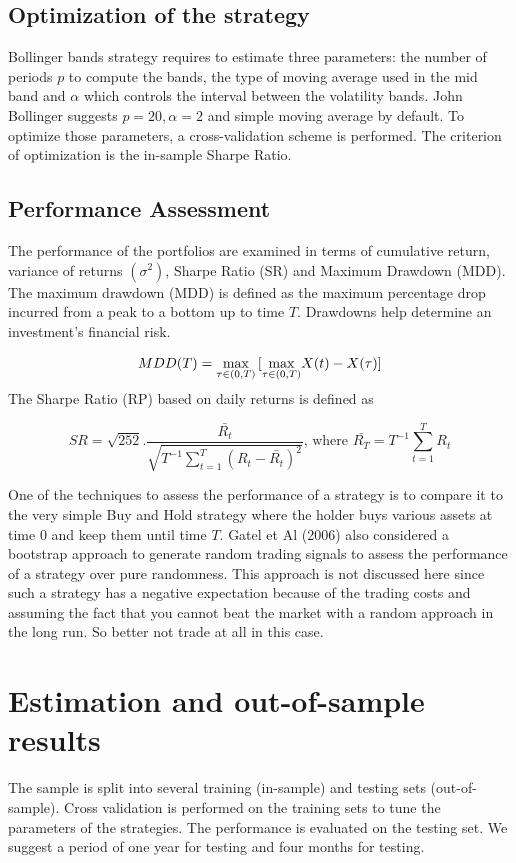 \documentclass[11pt,a4,twosided,singlespacing,titlepagenumber=on]{scrreprt}
\numberwithin{equation}{chapter} %
\theoremstyle{remark}
\begin{document}
\subsection{Optimization of the strategy}

Bollinger bands strategy requires to estimate three parameters: the number of periods $p$ to compute the bands, the type of moving average used in the mid band and $\alpha$ which controls the interval between the volatility bands. John Bollinger suggests $p = 20, \alpha = 2$ and simple moving average by default. To optimize those parameters, a cross-validation scheme is performed. The criterion of optimization is the in-sample Sharpe Ratio.

\subsection{Performance Assessment}
The performance of the portfolios are examined in terms of cumulative return, variance of returns $(\sigma^2)$, Sharpe Ratio (SR) and Maximum Drawdown (MDD). The maximum drawdown (MDD) is defined as the maximum percentage drop incurred from a peak to a bottom up to time $T$. Drawdowns help determine an investment's financial risk.

$$MDD(T) = \smash{\displaystyle\max_{\tau \in (0,T)}} \left[\smash{\displaystyle\max_{\tau \in (0,T)}} X(t) - X(\tau) \right] $$

The Sharpe Ratio (RP) based on daily returns is defined as

$$SR =  \sqrt{252 }  . \frac{\bar{R_t}}{\sqrt{T^{-1} \sum_{t=1}^T (R_t - \bar{R_t})^2 }} \text{, where } \bar{R_T} = T^{-1} \sum_{t=1}^T R_t $$

One of the techniques to assess the performance of a strategy is to compare it to the very simple Buy and Hold strategy where the holder buys various assets at time $0$ and keep them until time $T$. Gatel et Al (2006) also considered a bootstrap approach to generate random trading signals to assess the performance of a strategy over pure randomness. This approach is not discussed here since such a strategy has a negative expectation because of the trading costs and assuming the fact that you cannot beat the market with a random approach in the long run. So better not trade at all in this case.

\section{Estimation and out-of-sample results}
The sample is split into several training (in-sample) and testing sets (out-of-sample). Cross validation is performed on the training sets to tune the parameters of the strategies. The performance is evaluated on the testing set. We suggest a period of one year for testing and four months for testing.
\end{document}
